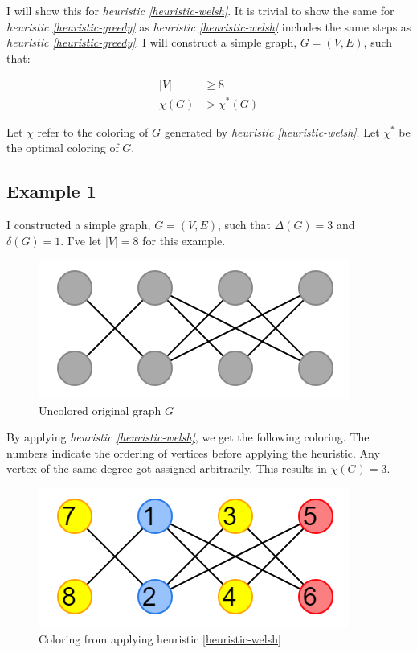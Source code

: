 \documentclass{article}
\newcounter{heuristic} \setcounter{heuristic}{0}
\theoremstyle{definition}
\begin{document}
I will show this for \emph{heuristic \ref{heuristic-welsh}}. It is trivial to show the same for \emph{heuristic \ref{heuristic-greedy}} as \emph{heuristic \ref{heuristic-welsh}} includes the same steps as \emph{heuristic \ref{heuristic-greedy}}. I will construct a simple graph, \(G = (V, E)\), such that:

\begin{align}
|V| &\geq 8 \\
\chi(G) &> \chi^{*}(G)
\end{align}

Let \(\chi\) refer to the coloring of \(G\) generated by \emph{heuristic \ref{heuristic-welsh}}. Let \(\chi^{*}\) be the optimal coloring of \(G\).

\subsection*{Example 1}
I constructed a simple graph, \(G = (V, E)\), such that \(\Delta(G) = 3\) and \(\delta(G) = 1\). I've let \(|V| = 8\) for this example.

\begin{figure}[H]
\centering
\includegraphics[scale=0.6]{images/graph-1.png}
\caption{Uncolored original graph \(G\)}
\end{figure}

By applying \emph{heuristic \ref{heuristic-welsh}}, we get the following coloring. The numbers indicate the ordering of vertices before applying the heuristic. Any vertex of the same degree got assigned arbitrarily. This results in \(\chi(G) = 3\).

\begin{figure}[H]
\centering
\includegraphics[scale=0.6]{images/graph-2.png}
\caption{Coloring from applying heuristic \ref{heuristic-welsh}}
\end{figure}
\end{document}
